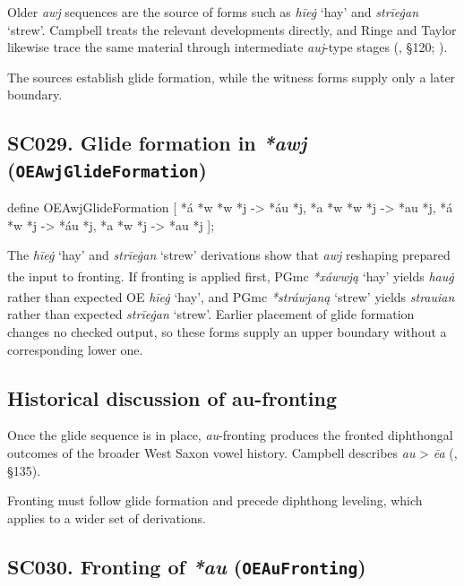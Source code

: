 \documentclass[
  british,
  a4paper,
  openany]{book}
\providecommand{\Pred}[1]{\textsuperscript{\dag}\emph{#1}}
\providecommand{\Recon}[1]{\emph{*#1}}
{\catcode`→=\active \global\def→{\ensuremath{\rightarrow}}}
\providecommand{\texorpdfstring}[2]{#1}
\providecommand{\Pred}[1]{\textsuperscript{\dag}\emph{#1}}
\providecommand{\Recon}[1]{\emph{*#1}}
{\catcode`→=\active \global\def→{\ensuremath{\rightarrow}}}
\begin{document}
Older \emph{awj} sequences are the source of forms such as \emph{hīeġ}
`hay' and \emph{strīeġan} `strew'. Campbell treats the relevant
developments directly, and Ringe and Taylor likewise trace the same
material through intermediate \emph{auj}-type stages
(, §120;
).

The sources establish glide formation, while the witness forms supply
only a later boundary.

\subsection{\texorpdfstring{SC029. Glide formation in \emph{*awj}
(\texttt{OEAwjGlideFormation})}{SC029. Glide formation in  (OEAwjGlideFormation)}}\label{rule-OEAwjGlideFormation}

\begin{ReaderFacingFoma}
define OEAwjGlideFormation [
    {*á} {*w} {*w} {*j} -> {*áu} {*j},
    {*a} {*w} {*w} {*j} -> {*au} {*j},
    {*á} {*w}      {*j} -> {*áu} {*j},
    {*a} {*w}      {*j} -> {*au} {*j}
];
\end{ReaderFacingFoma}

The \emph{hīeġ} `hay' and \emph{strīeġan} `strew' derivations show that
\emph{awj} reshaping prepared the input to fronting. If fronting is
applied first, PGmc \Recon{xáwwją} `hay' yields \Pred{hauġ} rather than
expected OE \emph{hīeġ} `hay', and PGmc \Recon{stráwjaną} `strew' yields
\Pred{strauian} rather than expected \emph{strīeġan} `strew'. Earlier
placement of glide formation changes no checked output, so these forms
supply an upper boundary without a corresponding lower one.

\subsection{Historical discussion of
au-fronting}\label{historical-discussion-of-au-fronting}

Once the glide sequence is in place, \emph{au}-fronting produces the
fronted diphthongal outcomes of the broader West Saxon vowel history.
Campbell describes \emph{au} \textgreater{} \emph{ēa}
(, §135).

Fronting must follow glide formation and precede diphthong leveling,
which applies to a wider set of derivations.

\subsection{\texorpdfstring{SC030. Fronting of \emph{*au}
(\texttt{OEAuFronting})}{SC030. Fronting of  (OEAuFronting)}}\label{rule-OEAuFronting}
\end{document}
